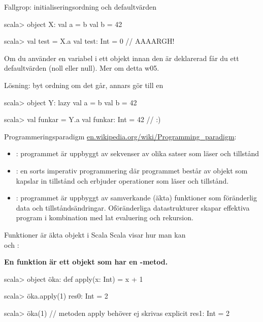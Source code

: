 \begin{Slide}{Fallgrop: initialiseringsordning och defaultvärden }
\begin{REPL}
scala> object X:
         val a = b
         val b = 42
                              
scala> val test = X.a
val test: Int = 0        // AAAARGH!
\end{REPL}
Om du använder en variabel i ett objekt innan den är deklarerad får du ett defaultvärden (noll eller null). Mer om detta w05.

\pause 

Lösning: byt ordning om det går, annars gör  till en 
\begin{REPL}
scala> object Y:
         lazy val a = b
         val b = 42
                              
scala> val funkar = Y.a
val funkar: Int = 42        // :)
\end{REPL}

\end{Slide}




\begin{Slide}{Programmeringsparadigm}
\href{https://en.wikipedia.org/wiki/Programming_paradigm}{en.wikipedia.org/wiki/Programming\_paradigm}:
\begin{itemize}
\item {}: programmet är uppbyggt av sekvenser av olika satser som läser och  tillstånd
\item {}: en sorts imperativ programmering där programmet består av objekt som kapslar in tillstånd och erbjuder operationer som läser och  tillstånd.
\item {}: programmet är uppbyggt av samverkande (äkta) funktioner som  föränderlig data och tillståndsändringar. Oföränderliga datastrukturer skapar effektiva program i kombination med lat evaluering och rekursion.
\end{itemize}
\end{Slide}


\begin{Slide}{Funktioner är äkta objekt i Scala}
Scala visar hur man kan   \\  och : \\\vspace{0.5em}

\textbf{En funktion är ett objekt som har en -metod.}
\pause
\begin{REPLnonum}
scala> object öka:
         def apply(x: Int) = x + 1

scala> öka.apply(1)
res0: Int = 2

scala> öka(1)   // metoden apply behöver ej skrivas explicit
res1: Int = 2
\end{REPLnonum}
\end{Slide}




